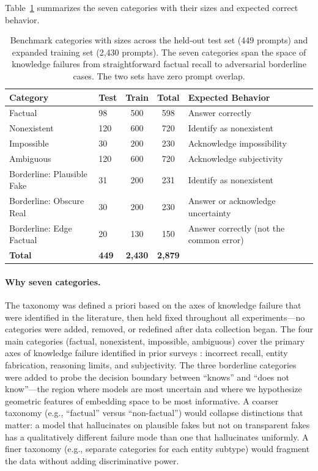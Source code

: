 \vspace{0.5em}

Table~\ref{tab:categories} summarizes the seven categories with their sizes and expected correct behavior.

\begin{table}[ht]
\centering
\small
\begin{tabular}{llccl}
\toprule
\textbf{Category} & \textbf{Test} & \textbf{Train} & \textbf{Total} & \textbf{Expected Behavior} \\
\midrule
Factual & 98 & 500 & 598 & Answer correctly \\
Nonexistent & 120 & 600 & 720 & Identify as nonexistent \\
Impossible & 30 & 200 & 230 & Acknowledge impossibility \\
Ambiguous & 120 & 600 & 720 & Acknowledge subjectivity \\
Borderline: Plausible Fake & 31 & 200 & 231 & Identify as nonexistent \\
Borderline: Obscure Real & 30 & 200 & 230 & Answer or acknowledge uncertainty \\
Borderline: Edge Factual & 20 & 130 & 150 & Answer correctly (not the common error) \\
\midrule
\textbf{Total} & \textbf{449} & \textbf{2,430} & \textbf{2,879} & \\
\bottomrule
\end{tabular}
\caption{Benchmark categories with sizes across the held-out test set (449 prompts) and expanded training set (2,430 prompts). The seven categories span the space of knowledge failures from straightforward factual recall to adversarial borderline cases. The two sets have zero prompt overlap.}
\label{tab:categories}
\end{table}

\paragraph{Why seven categories.} The taxonomy was defined a priori based on the axes of knowledge failure that were identified in the literature, then held fixed throughout all experiments---no categories were added, removed, or redefined after data collection began. The four main categories (factual, nonexistent, impossible, ambiguous) cover the primary axes of knowledge failure identified in prior surveys \citep{ji2023survey}: incorrect recall, entity fabrication, reasoning limits, and subjectivity. The three borderline categories were added to probe the decision boundary between ``knows'' and ``does not know''---the region where models are most uncertain and where we hypothesize geometric features of embedding space to be most informative. A coarser taxonomy (e.g., ``factual'' versus ``non-factual'') would collapse distinctions that matter: a model that hallucinates on plausible fakes but not on transparent fakes has a qualitatively different failure mode than one that hallucinates uniformly. A finer taxonomy (e.g., separate categories for each entity subtype) would fragment the data without adding discriminative power.

